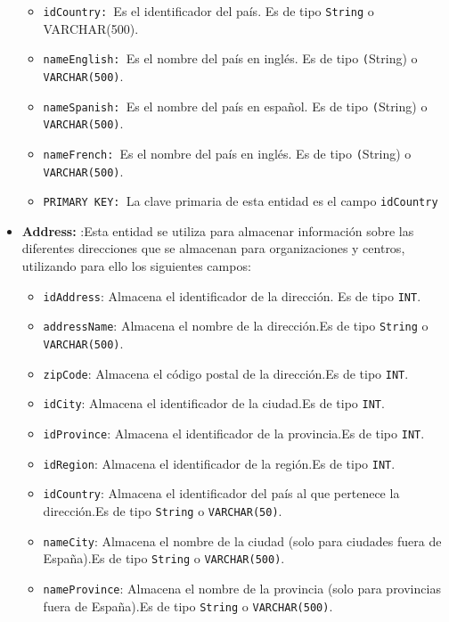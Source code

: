 \begin{itemize}
    \begin{itemize}
      \item \texttt{idCountry: }Es el identificador del país. Es de tipo \texttt{String} o VARCHAR(500).
      \item \texttt{nameEnglish: }Es el nombre del país en inglés. Es de tipo \texttt(String) o \texttt{VARCHAR(500)}.
      \item \texttt{nameSpanish: }Es el nombre del país en español. Es de tipo \texttt(String) o \texttt{VARCHAR(500)}. 
      \item \texttt{nameFrench: }Es el nombre del país en inglés. Es de tipo \texttt(String) o \texttt{VARCHAR(500)}.
      \item \texttt{PRIMARY KEY: }La clave primaria de esta entidad es el campo \texttt{idCountry}
    \end{itemize}
    \item \textbf{Address: }:Esta entidad se utiliza para almacenar información sobre las diferentes direcciones que se almacenan para organizaciones y centros, utilizando para ello los siguientes campos:
        \begin{itemize}
        \item \texttt{idAddress}: Almacena el identificador de la dirección. Es de tipo \texttt{INT}.
        \item \texttt{addressName}: Almacena el nombre de la dirección.Es de tipo \texttt{String} o \texttt{VARCHAR(500)}.
        \item \texttt{zipCode}: Almacena el código postal de la dirección.Es de tipo \texttt{INT}.
        \item \texttt{idCity}: Almacena el identificador de la ciudad.Es de tipo \texttt{INT}.
        \item \texttt{idProvince}: Almacena el identificador de la provincia.Es de tipo \texttt{INT}.
        \item \texttt{idRegion}: Almacena el identificador de la región.Es de tipo \texttt{INT}.
        \item \texttt{idCountry}: Almacena el identificador del país al que pertenece la dirección.Es de tipo \texttt{String} o \texttt{VARCHAR(50)}.
        \item \texttt{nameCity}: Almacena el nombre de la ciudad (solo para ciudades fuera de España).Es de tipo \texttt{String} o \texttt{VARCHAR(500)}.
        \item \texttt{nameProvince}: Almacena el nombre de la provincia (solo para provincias fuera de España).Es de tipo \texttt{String} o \texttt{VARCHAR(500)}.

\end{itemize}
\end{itemize}
